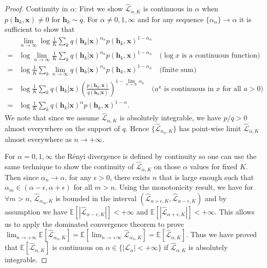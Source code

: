 \begin{proof}
%
Continuity in $\alpha$: First we show $\hat{\mathcal{L}}_{\alpha, K}$ is continuous in $\alpha$ when $p(\bm{h}_k, \bm{x}) \neq 0$ for $\bm{h}_k \sim q$. For $\alpha \neq 0, 1, \infty$ and for any sequence $\{\alpha_n\} \rightarrow \alpha$ it is sufficient to show that
\begin{equation*}
\begin{aligned}
&\lim_{n \rightarrow \infty} \log \frac{1}{K} \sum_k q(\bm{h}_k|\bm{x})^{\alpha_n} p(\bm{h}_k, \bm{x})^{1 - \alpha_n} \\
=& \log \lim_{n \rightarrow \infty} \frac{1}{K} \sum_k q(\bm{h}_k|\bm{x})^{\alpha_n} p(\bm{h}_k, \bm{x})^{1 - \alpha_n} \quad \text{($\log x$ is a continuous function)} \\
=& \log \frac{1}{K} \sum_k \lim_{n \rightarrow \infty} q(\bm{h}_k|\bm{x})^{\alpha_n} p(\bm{h}_k, \bm{x})^{1 - \alpha_n} \quad \text{(finite sum)} \\
=& \log \frac{1}{K} \sum_k  q(\bm{h}_k|\bm{x}) \left( \frac{p(\bm{h}_k, \bm{x})}{q(\bm{h}_k|\bm{x})} \right)^{1 - \lim_{n \rightarrow \infty} \alpha_n} \quad \text{($a^x$ is continuous in $x$ for all $a > 0$)} \\
=& \log \frac{1}{K} \sum_k q(\bm{h}_k|\bm{x})^{\alpha} p(\bm{h}_k, \bm{x})^{1 - \alpha}.
\end{aligned}
\end{equation*}
We note that since we assume $\hat{\mathcal{L}}_{\alpha, K}$ is absolutely integrable, we have $p/q > 0$ almost everywhere on the support of $q$. Hence $\{ \hat{\mathcal{L}}_{\alpha_n, K} \}$ has point-wise limit $\hat{\mathcal{L}}_{\alpha, K}$ almost everywhere as $n \rightarrow +\infty$. 

For $\alpha = 0, 1, \infty$ the R{\'e}nyi divergence is defined by continuity so one can use the same technique to show the continuity of $\hat{\mathcal{L}}_{\alpha, K} $ on those $\alpha$ values for fixed $K$. Then since $\alpha_n \rightarrow \alpha$, for any $\epsilon > 0$, there exists $n$ that is large enough such that $\alpha_m \in (\alpha - \epsilon, \alpha + \epsilon)$ for all $m > n$. Using the monotonicity result, we have for $\forall m > n$, $\hat{\mathcal{L}}_{\alpha_m, K}$ is bounded in the interval $(\hat{\mathcal{L}}_{\alpha + \epsilon, K}, \hat{\mathcal{L}}_{\alpha - \epsilon, K})$ and by assumption we have $\mathbb{E}[ |\hat{\mathcal{L}}_{\alpha -\epsilon, K}|] < +\infty$ and $\mathbb{E}[ |\hat{\mathcal{L}}_{\alpha +\epsilon, K}|] < +\infty$. This allows us to apply the dominated convergence theorem to prove $\lim_{n \rightarrow +\infty} \mathbb{E}[\hat{\mathcal{L}}_{\alpha_n, K}] = \mathbb{E}[ \lim_{n \rightarrow +\infty} \hat{\mathcal{L}}_{\alpha_n, K}] = \mathbb{E}[ \hat{\mathcal{L}}_{\alpha, K}]$. Thus we have proved that $\mathbb{E}[ \hat{\mathcal{L}}_{\alpha, K}]$ is continuous on $\alpha \in \{ |\mathcal{L}_{\alpha}| < +\infty \}$ if $\hat{\mathcal{L}}_{\alpha, K}$ is absolutely integrable.

\end{proof}

